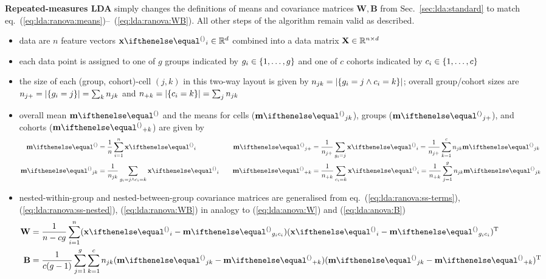 \documentclass[a4paper]{article}
\begin{document}
\textbf{Repeated-measures LDA} simply changes the definitions of means and covariance matrices $\mathbf{W}, \mathbf{B}$ from Sec.~\ref{sec:lda:standard} to match eq.~(\ref{eq:lda:ranova:means})--~(\ref{eq:lda:ranova:WB}). All other steps of the algorithm remain valid as described.
\begin{itemize}
\item data are $n$ feature vectors $\vx_i \in \setR^d$ combined into a data matrix $\mathbf{X}\in \mathbb{R}^{n\times d}$
\item each data point is assigned to one of $g$ groups indicated by $g_i\in \left\{1, \ldots, g\right\}$ and one of $c$ cohorts indicated by $c_i\in \left\{1, \ldots, c\right\}$
\item the size of each (group, cohort)-cell $(j, k)$ in this two-way layout is given by $n_{jk} = \left\lvert\left\{g_i = j \wedge c_i = k\right\}\right\rvert$; overall group/cohort sizes are $n_{j+} = \left\lvert\left\{g_i = j\right\}\right\rvert = \sum_k n_{jk}$ and $n_{+k} = \left\lvert\left\{c_i = k\right\}\right\rvert = \sum_j n_{jk}$ 
\item overall mean $\vm$ and the means for cells ($\vm_{jk}$), groups ($\vm_{j+}$), and cohorts ($\vm_{+k}$) are given by
  \begin{equation}
    \begin{aligned}
      \label{eq:lda:repeated:means}
      \vm &= \frac1n \sum_{i=1}^n \vx_i 
      &\quad \vm_{j+} &= \frac1{n_{j+}} \sum_{g_i = j} \vx_i = \frac1{n_{j+}} \sum_{k=1}^c n_{jk} \vm_{jk} \\
      \vm_{jk} &= \frac1{n_{jk}} \sum_{g_i = j \wedge c_i = k} \vx_i 
      &\quad \vm_{+k} &= \frac1{n_{+k}} \sum_{c_i = k} \vx_i = \frac1{n_{+k}} \sum_{j=1}^g n_{jk} \vm_{jk}
    \end{aligned}
  \end{equation}
\item nested-within-group and nested-between-group covariance matrices are generalised from eq.~(\ref{eq:lda:ranova:ss-terms}), (\ref{eq:lda:ranova:ss-nested}), (\ref{eq:lda:ranova:WB}) in analogy to (\ref{eq:lda:anova:W}) and (\ref{eq:lda:anova:B})
  \begin{align}
    \label{eq:lda:repeated:W}
    \mathbf{W} &= \frac1{n - cg} \sum_{i=1}^n (\vx_i - \vm_{g_i c_i}) (\vx_i - \vm_{g_i c_i})\T \\
    \label{eq:lda:repeated:B}
    \mathbf{B} &= \frac1{c (g - 1)} \sum_{j=1}^g \sum_{k=1}^c n_{jk} (\vm_{jk} - \vm_{+k}) (\vm_{jk} - \vm_{+k})\T
  \end{align}
\end{itemize}
\end{document}
